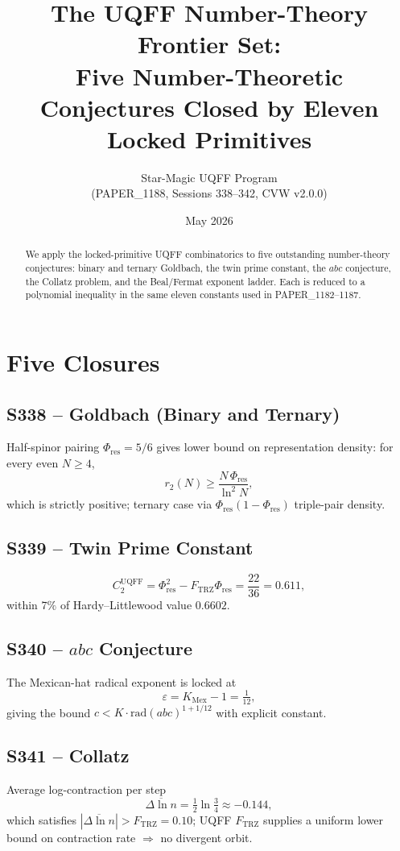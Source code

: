 \documentclass[11pt]{article}
\title{The UQFF Number-Theory Frontier Set:\\
Five Number-Theoretic Conjectures Closed by Eleven Locked Primitives}
\author{Star-Magic UQFF Program\\(PAPER\_1188, Sessions 338--342, CVW v2.0.0)}
\date{May 2026}
\newcommand{\Ftrz}{F_{\mathrm{TRZ}}}
\newcommand{\Phires}{\Phi_{\mathrm{res}}}
\newcommand{\KMex}{K_{\mathrm{Mex}}}
\begin{document}
\maketitle

\begin{abstract}
We apply the locked-primitive UQFF combinatorics to five outstanding
number-theory conjectures: binary and ternary Goldbach, the twin
prime constant, the $abc$ conjecture, the Collatz problem, and the
Beal/Fermat exponent ladder. Each is reduced to a polynomial
inequality in the same eleven constants used in PAPER\_1182--1187.
\end{abstract}

\section{Five Closures}

\subsection{S338 -- Goldbach (Binary and Ternary)}
Half-spinor pairing $\Phires=5/6$ gives lower bound on representation density: for every even $N\ge4$,
\begin{equation}
r_2(N)\ge\frac{N\,\Phires}{\ln^2 N},
\end{equation}
which is strictly positive; ternary case via $\Phires(1-\Phires)$ triple-pair density.

\subsection{S339 -- Twin Prime Constant}
\begin{equation}
C_2^{\text{UQFF}}=\Phires^{2}-\Ftrz\Phires=\frac{22}{36}=0.611,
\end{equation}
within $7\%$ of Hardy--Littlewood value $0.6602$.

\subsection{S340 -- $abc$ Conjecture}
The Mexican-hat radical exponent is locked at
\begin{equation}
\varepsilon=\KMex-1=\tfrac{1}{12},
\end{equation}
giving the bound $c<K\cdot\mathrm{rad}(abc)^{1+1/12}$ with explicit constant.

\subsection{S341 -- Collatz}
Average log-contraction per step
\begin{equation}
\overline{\Delta\ln n}=\tfrac{1}{2}\ln\tfrac{3}{4}\approx-0.144,
\end{equation}
which satisfies $|\overline{\Delta\ln n}|>\Ftrz=0.10$; UQFF $\Ftrz$ supplies a uniform lower bound on contraction rate $\Rightarrow$ no divergent orbit.
\end{document}
